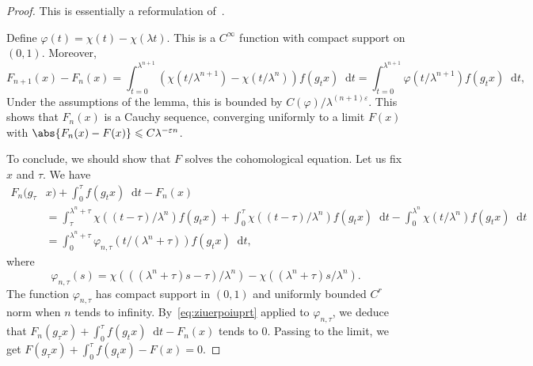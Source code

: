 \documentclass[11pt, a4paper, oneside, final, pagebackref]{amsart}
\newcommand{\dd}{\mathop{}\!\mathrm{d}}
\renewcommand{\epsilon}{\varepsilon}
\renewcommand{\phi}{\varphi}
\renewcommand{\leq}{\leqslant}
\theoremstyle{definition}
\numberwithin{equation}{section}
\begin{document}
\begin{proof}
This is essentially a reformulation of~\cite[Lemmas~1.4
and~3.1]{giulietti_liverani}.

Define $\phi(t) = \chi(t)-\chi(\lambda t)$. This is a $C^\infty$ function
with compact support on $(0,1)$. Moreover,
\begin{equation*}
  F_{n+1}(x) - F_n(x) = \int_{t=0}^{\lambda^{n+1}} (\chi(t/\lambda^{n+1}) - \chi(t/\lambda^n)) f(g_t x) \dd t
  = \int_{t=0}^{\lambda^{n+1}} \phi(t/\lambda^{n+1}) f(g_t x) \dd t,
\end{equation*}
Under the assumptions of the lemma, this is bounded by
$C(\phi)/\lambda^{(n+1)\epsilon}$. This shows that $F_n(x)$ is a Cauchy
sequence, converging uniformly to a limit $F(x)$ with $\abs{F_n(x)-F(x)} \leq
C \lambda^{-\epsilon n}$.

To conclude, we should show that $F$ solves the cohomological equation. Let
us fix $x$ and $\tau$. We have
\begin{align*}
  F_n(g_\tau& x) + \int_{0}^\tau f(g_t x) \dd t - F_n(x)
  \\&= \int_{\tau}^{\lambda^n + \tau} \chi((t-\tau)/\lambda^n) f(g_t x) + \int_{0}^\tau \chi((t-\tau)/\lambda^n) f(g_t x) \dd t
  - \int_0^{\lambda^n} \chi(t/\lambda^n) f(g_t x) \dd t
  \\& = \int_0^{\lambda^n + \tau} \phi_{n,\tau}(t/(\lambda^n + \tau)) f(g_t x) \dd t,
\end{align*}
where
\begin{equation*}
  \phi_{n,\tau}(s) = \chi( ((\lambda^n+\tau) s - \tau)/\lambda^n) - \chi( (\lambda^n+\tau)s/\lambda^n).
\end{equation*}
The function $\phi_{n,\tau}$ has compact support in $(0,1)$ and uniformly
bounded $C^r$ norm when $n$ tends to infinity. By~\eqref{eq:ziuerpoiuprt}
applied to $\phi_{n,\tau}$, we deduce that $F_n(g_\tau x) + \int_{0}^\tau
f(g_t x) \dd t - F_n(x)$ tends to $0$. Passing to the limit, we get $F(g_\tau
x) + \int_0^\tau f(g_t x) - F(x) = 0$.
\end{proof}
\end{document}
